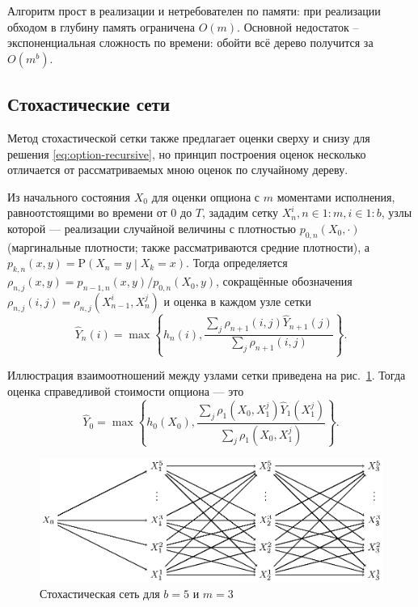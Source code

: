 \documentclass[specialist,
               substylefile = ../spbu.rtx,
               subf,href,colorlinks=true, 10pt]{disser}
\newcommand{\prob}[1]{\mathrm{P}\left(#1\right)}
\begin{document}
Алгоритм прост в реализации и нетребователен по памяти: при реализации обходом в глубину память ограничена $O(m)$. Основной недостаток -- экспоненциальная сложность по времени: обойти всё дерево получится за $O(m^b)$.


\subsection{Стохастические сети} %
\label{sub:mesh_estimator}

Метод стохастической сетки также предлагает оценки сверху и снизу для решения \eqref{eq:option-recursive}, но принцип построения оценок несколько отличается от рассматриваемых мною оценок по случайному дереву.

Из начального состояния $X_0$ для оценки опциона с $m$ моментами исполнения, равноотстоящими во времени от 0 до $T$, зададим сетку $X_n^i, n\in 1\mathbin{:}m, i \in 1\mathbin{:}b$, узлы которой --- реализации случайной величины с плотностью $p_{0, n}(X_0, \cdot)$ (маргинальные плотности; также рассматриваются средние плотности), а $p_{k, n}(x, y) = \prob{X_n = y \middle\vert X_k = x}$. Тогда определяется $\rho_{n, j}(x, y) = p_{n-1, n}(x, y) / p_{0, n}(X_0, y)$, сокращённые обозначения $\rho_{n, j}(i, j) = \rho_{n, j}(X_{n-1}^i, X_n^j)$ и оценка в каждом узле сетки
$$\hat Y_n(i) = \max\left\lbrace h_n(i), \frac{\sum_j \rho_{n+1}(i, j) \hat Y_{n+1}(j)}{\sum_j \rho_{n+1}(i, j)} \right\rbrace.$$

Иллюстрация взаимоотношений между узлами сетки приведена на рис.~\ref{fig:stochastic_mesh}. Тогда оценка справедливой стоимости опциона --- это $$\hat Y_0 = \max\left\lbrace h_0(X_0), \frac{\sum_j \rho_{1}(X_0, X_1^j) \hat Y_{1}(X_1^j)}{\sum_j \rho_{1}(X_0, X_1^j)} \right\rbrace.$$

\begin{figure}[h]
    \centering
	\includegraphics{stohastic_mesh_vector.eps}
	\caption{Стохастическая сеть для $b = 5$ и $m = 3$}
	\label{fig:stochastic_mesh}
\end{figure}
\end{document}
